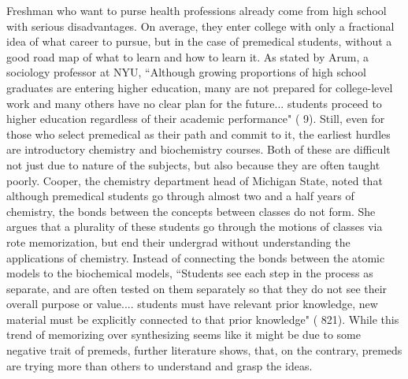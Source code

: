 \documentclass [12pt]{article}
\begin{document}
\begin{flushleft}
Freshman who want to purse health professions already come from high school with serious disadvantages. On average, they enter college with only a fractional idea of what career to pursue, but in the case of premedical students, without a good road map of what to learn and how to learn it. As stated by Arum, a sociology professor at NYU, {``}Although growing proportions of high school graduates are entering higher education, many are not prepared for college-level work and many others have no clear plan for the future... students proceed to higher education regardless of their academic performance" (\cite{Arum-2011} 9). Still, even for those who select premedical as their path and commit to it, the earliest hurdles are introductory chemistry and biochemistry courses. Both of these are difficult not just due to nature of the subjects, but also because they are often taught poorly. Cooper, the chemistry department head of Michigan State, noted that although premedical students go through almost two and a half years of chemistry, the bonds between the concepts between classes do not form. She argues that a plurality of these students go through the motions of classes via rote memorization, but end their undergrad without understanding the applications of chemistry. Instead of connecting the bonds between the atomic models to the biochemical models, {``}Students see each step in the process as separate, and are often tested on them separately so that they do not see their overall purpose or value.... students must have relevant prior knowledge, new material must be explicitly connected to that prior knowledge" (\cite{Cooper-2013} 821). While this trend of memorizing over synthesizing seems like it might be due to some negative trait of premeds, further literature shows, that, on the contrary, premeds are trying more than others to understand and grasp the ideas.



\end{flushleft}
\end{document}
